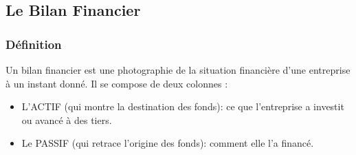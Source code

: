 \documentclass[a4paper,10pt]{article}
\begin{document}
\subsection{Le Bilan Financier}

	\subsubsection{Définition}
Un bilan financier est une photographie de la situation financière d’une entreprise à un instant donné. 
Il se compose de deux colonnes :\\
\begin{itemize}
\item L’ACTIF (qui montre la destination des fonds): ce que l'entreprise a investit ou avancé à des tiers. \\
\item Le PASSIF (qui retrace l'origine des fonds): comment elle l'a financé. \\
\end{itemize}
\end{document}
